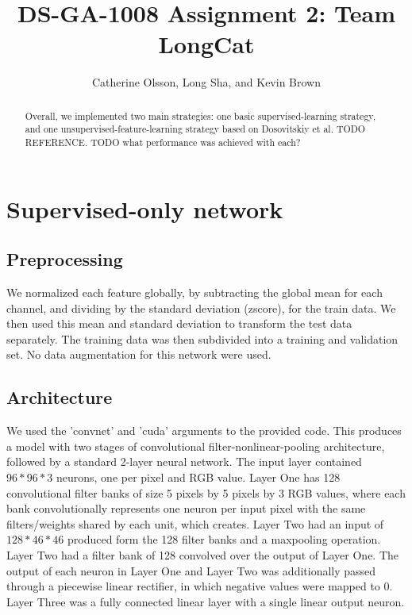 \documentclass{article} %
\title{DS-GA-1008 Assignment 2: Team LongCat}
\author{
Catherine Olsson, Long Sha, and Kevin Brown \\
}
\begin{document}
\maketitle

\begin{abstract}
Overall, we implemented two main strategies: one basic supervised-learning strategy, and one unsupervised-feature-learning strategy based on Dosovitskiy et al. TODO REFERENCE. TODO what performance was achieved with each?
\end{abstract}

\section{Supervised-only network}

\subsection{Preprocessing}

We normalized each feature globally, by subtracting the global mean for each
channel, and dividing by the standard deviation (zscore), for the train data.
We then used this mean and standard deviation to transform the test data
separately. The training data was then subdivided into a training and validation
set. No data augmentation for this network were used. 

\subsection{Architecture}

We used the 'convnet' and 'cuda' arguments to the provided code. This produces
a model with two stages of convolutional filter-nonlinear-pooling architecture,
followed by a standard 2-layer neural network. The input layer contained
$96*96*3$ neurons, one per pixel and RGB value. Layer One has 128 convolutional
filter banks of size 5 pixels by 5 pixels by 3 RGB values, where each bank
convolutionally represents one neuron per input pixel with the same
filters/weights shared by each unit, which creates. Layer Two had an input of
$128*46*46$ produced form the 128 filter banks and a maxpooling operation.
Layer Two had a filter bank of 128 convolved over the output of Layer One.  The
output of each neuron in Layer One and Layer Two was additionally passed
through a piecewise linear rectifier, in which negative values were mapped to
0. Layer Three was a fully connected linear layer with a single linear output
neuron.  
\end{document}
